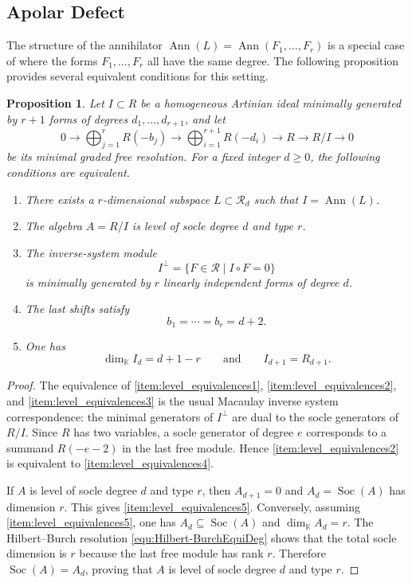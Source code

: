 \documentclass[a4paper, 11pt]{amsart}
\numberwithin{theorem}{section}
\newtheorem{proposition}[theorem]{Proposition}
\theoremstyle{definition}
\numberwithin{equation}{section}
\DeclareMathOperator{\Ann}{\operatorname{Ann}}
\begin{document}
\subsection{Apolar Defect} \label{subsec:ApolarDefect}
The structure of the annihilator $\Ann(L) = \Ann(F_1,\dots,F_r)$ is a special case of  where the forms $F_1,\dots,F_r$ all have the same degree. 
The following proposition provides several equivalent conditions for this setting. 
\begin{proposition}
\label{prop:level_equivalences}
Let $I\subset R$ be a homogeneous Artinian ideal minimally generated by $r+1$ forms of degrees $d_1,\ldots,d_{r+1}$, and let
\begin{equation}\label{equ:Hilbert-BurchEquiDeg}
    0\longrightarrow \bigoplus_{j=1}^{r}R(-b_j)
\longrightarrow \bigoplus_{i=1}^{r+1}R(-d_i)
\longrightarrow R \longrightarrow R/I \longrightarrow 0
\end{equation}
be its minimal graded free resolution.
For a fixed integer $d\geq 0$, the following conditions are equivalent.
\begin{enumerate}[label=\textnormal{(\roman*)}]
    \item\label{item:level_equivalences1} There exists a $r$-dimensional subspace $L\subset \mathcal{R}_d$ such that $I=\Ann(L)$.
    \item\label{item:level_equivalences2} The algebra $A=R/I$ is level of socle degree $d$ and type $r$.
    \item\label{item:level_equivalences3} The inverse-system module
    \[
    I^{\perp}=\{F\in\mathcal{R}\mid I\circ F=0\}
    \]
    is minimally generated by $r$ linearly independent forms of degree $d$.
    \item\label{item:level_equivalences4} The last shifts satisfy
    \[
    b_1=\cdots=b_r=d+2.
    \]
    \item\label{item:level_equivalences5} One has
    \[
    \dim_{\mathbb{K}}I_d=d+1-r
    \qquad\text{and}\qquad
    I_{d+1}=R_{d+1}.
    \]
\end{enumerate}
\end{proposition}

\begin{proof}
The equivalence of \ref{item:level_equivalences1}, \ref{item:level_equivalences2}, and \ref{item:level_equivalences3} is the usual Macaulay inverse system correspondence: the minimal generators of $I^\perp$ are dual to the socle generators of $R/I$.
Since $R$ has two variables, a socle generator of degree $e$ corresponds to a summand $R(-e-2)$ in the last free module.  Hence \ref{item:level_equivalences2} is equivalent to \ref{item:level_equivalences4}.

If $A$ is level of socle degree $d$ and type $r$, then $A_{d+1}=0$ and $A_d=\operatorname{Soc}(A)$ has dimension $r$.  
This gives \ref{item:level_equivalences5}.
Conversely, assuming \ref{item:level_equivalences5}, one has $A_d\subseteq \operatorname{Soc}(A)$ and $\dim_{\mathbb{K}}A_d=r$.
The Hilbert--Burch resolution \eqref{equ:Hilbert-BurchEquiDeg} shows that the total socle dimension is $r$ because the last free module has rank $r$.
Therefore $\operatorname{Soc}(A)=A_d$, proving that $A$ is level of socle degree $d$ and type $r$.
\end{proof}
\end{document}
